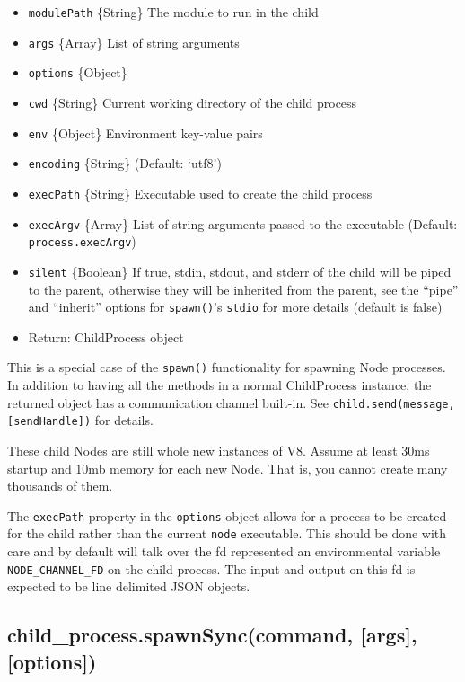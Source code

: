 \begin{itemize}
\itemsep1pt\parskip0pt
\item
  \texttt{modulePath} \{String\} The module to run in the child
\item
  \texttt{args} \{Array\} List of string arguments
\item
  \texttt{options} \{Object\}
\item
  \texttt{cwd} \{String\} Current working directory of the child process
\item
  \texttt{env} \{Object\} Environment key-value pairs
\item
  \texttt{encoding} \{String\} (Default: `utf8')
\item
  \texttt{execPath} \{String\} Executable used to create the child
  process
\item
  \texttt{execArgv} \{Array\} List of string arguments passed to the
  executable (Default: \texttt{process.execArgv})
\item
  \texttt{silent} \{Boolean\} If true, stdin, stdout, and stderr of the
  child will be piped to the parent, otherwise they will be inherited
  from the parent, see the ``pipe'' and ``inherit'' options for
  \texttt{spawn()}'s \texttt{stdio} for more details (default is false)
\item
  Return: ChildProcess object
\end{itemize}

This is a special case of the \texttt{spawn()} functionality for
spawning Node processes. In addition to having all the methods in a
normal ChildProcess instance, the returned object has a communication
channel built-in. See \texttt{child.send(message, {[}sendHandle{]})} for
details.

These child Nodes are still whole new instances of V8. Assume at least
30ms startup and 10mb memory for each new Node. That is, you cannot
create many thousands of them.

The \texttt{execPath} property in the \texttt{options} object allows for
a process to be created for the child rather than the current
\texttt{node} executable. This should be done with care and by default
will talk over the fd represented an environmental variable
\texttt{NODE\_CHANNEL\_FD} on the child process. The input and output on
this fd is expected to be line delimited JSON objects.

\subsection{child\_process.spawnSync(command, {[}args{]},
{[}options{]})}\label{childux5fprocess.spawnsynccommand-args-options}

